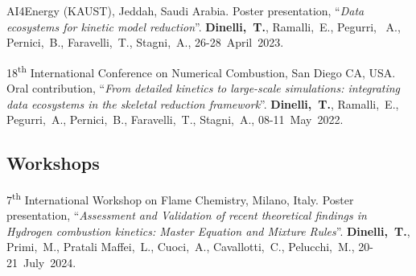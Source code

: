 \begin{etaremune}
    \item
    AI4Energy (KAUST), Jeddah, Saudi Arabia. Poster presentation, ``{\it Data ecosystems for
    kinetic model reduction}''. {\bf Dinelli,~T.}, Ramalli,~E., Pegurri,
    ~A., Pernici,~B., Faravelli,~T., Stagni,~A.,
    26-28~April~2023.

    \item
    18\textsuperscript{th} International Conference on Numerical Combustion, San Diego
    CA, USA. Oral contribution, ``{\it From detailed kinetics to large-scale
    simulations: integrating data ecosystems in the skeletal reduction framework}''.
    {\bf Dinelli,~T.}, Ramalli,~E., Pegurri,~A., Pernici,~B.,
    Faravelli,~T., Stagni,~A.,
    08-11~May~2022.
\end{etaremune}

\subsection{Workshops}
\begin{etaremune}
    \item
    7\textsuperscript{th} International Workshop on Flame Chemistry, Milano, Italy.
    Poster presentation, ``{\it Assessment and Validation of recent theoretical
    findings in Hydrogen combustion kinetics: Master Equation and Mixture Rules}''.
    {\bf Dinelli,~T.}, Primi,~M., Pratali Maffei,~L., Cuoci,~A.,
    Cavallotti,~C., Pelucchi,~M.,
    20-21~July~2024.
\end{etaremune}
